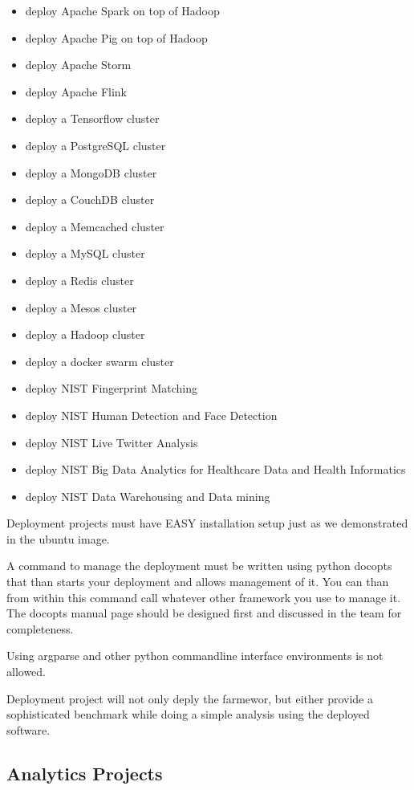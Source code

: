 \begin{itemize}
\tightlist
\item
  deploy Apache Spark on top of Hadoop
\item
  deploy Apache Pig on top of Hadoop
\item
  deploy Apache Storm
\item
  deploy Apache Flink
\item
  deploy a Tensorflow cluster
\item
  deploy a PostgreSQL cluster
\item
  deploy a MongoDB cluster
\item
  deploy a CouchDB cluster
\item
  deploy a Memcached cluster
\item
  deploy a MySQL cluster
\item
  deploy a Redis cluster
\item
  deploy a Mesos cluster
\item
  deploy a Hadoop cluster
\item
  deploy a docker swarm cluster
\item
  deploy NIST Fingerprint Matching
\item
  deploy NIST Human Detection and Face Detection
\item
  deploy NIST Live Twitter Analysis
\item
  deploy NIST Big Data Analytics for Healthcare Data and Health
  Informatics
\item
  deploy NIST Data Warehousing and Data mining
\end{itemize}

Deployment projects must have EASY installation setup just as we
demonstrated in the ubuntu image.

A command to manage the deployment must be written using python docopts
that than starts your deployment and allows management of it. You can
than from within this command call whatever other framework you use to
manage it. The docopts manual page should be designed first and
discussed in the team for completeness.

Using argparse and other python commandline interface environments is
not allowed.

Deployment project will not only deply the farmewor, but either provide
a sophisticated benchmark while doing a simple analysis using the
deployed software.

\subsection{Analytics Projects}\label{analytics-projects}


